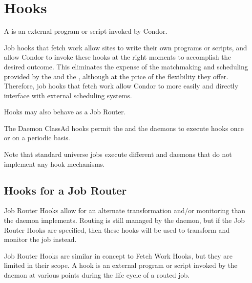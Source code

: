 \section{\label{sec:hooks}Hooks}
A  is an external program or script invoked by Condor.

Job hooks that fetch work allow sites to write their own programs or scripts, 
and allow Condor to invoke these hooks at the right moments 
to accomplish the desired outcome.
This eliminates the expense of the matchmaking and scheduling provided 
by the  and the ,
although at the price of the flexibility they offer. 
Therefore, job hooks that fetch work allow Condor to more easily and directly
interface with external scheduling systems. 

Hooks may also behave as a Job Router.

The Daemon ClassAd hooks permit the  and 
the  daemons to execute hooks once or on a periodic basis.

Note that standard universe jobs execute different  and
 daemons that do not implement any hook mechanisms.




\subsection{\label{sec:job-hooks-JR-overview}
Hooks for a Job Router}

Job Router Hooks allow for an alternate transformation and/or 
monitoring than the  daemon implements.
Routing is still managed by the  daemon,
but if the Job Router Hooks are specified,
then these hooks will be used to transform
and monitor the job instead.

Job Router Hooks are similar in concept to Fetch Work Hooks,
but they are limited in their scope.
A hook is an external program or script invoked by the 
daemon at various points during the life cycle of a routed job.

